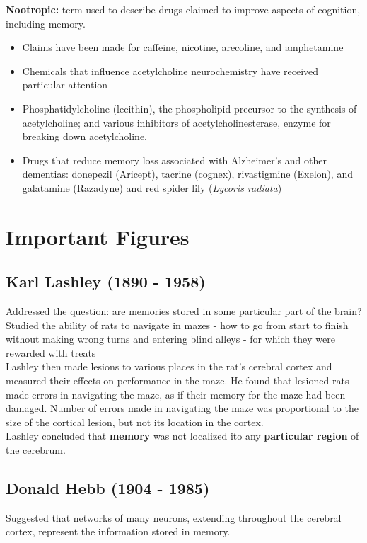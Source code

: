 \documentclass{article}
\begin{document}
\noindent \textbf{Nootropic:} term used to describe drugs claimed to improve aspects of cognition, including memory. 
\begin{itemize}
    \item Claims have been made for caffeine, nicotine, arecoline, and amphetamine
    \item Chemicals that influence acetylcholine neurochemistry have received particular attention
    \item Phosphatidylcholine (lecithin), the phospholipid precursor to the synthesis of acetylcholine; and various inhibitors of acetylcholinesterase, enzyme for breaking down acetylcholine. 
    \item Drugs that reduce memory loss associated with Alzheimer's and other dementias: donepezil (Aricept), tacrine (cognex), rivastigmine (Exelon), and galatamine (Razadyne) and red spider lily (\textit{Lycoris radiata})
\end{itemize}

\newpage
\section{Important Figures}

\subsection{Karl Lashley (1890 - 1958)}
Addressed the question: are memories stored in some particular part of the brain? \\ 
Studied the ability of rats to navigate in mazes - how to go from start to finish without making wrong turns and entering blind alleys - for which they were rewarded with treats \\ 

Lashley then made lesions to various places in the rat's cerebral cortex and measured their effects on performance in the maze. He found that lesioned rats made errors in navigating the maze, as if their memory for the maze had been damaged. Number of errors made in navigating the maze was proportional to the size of the cortical lesion, but not its location in the cortex. \\

Lashley concluded that \textbf{memory} was not localized ito any \textbf{particular region} of the cerebrum. 

\subsection{Donald Hebb (1904 - 1985)}
Suggested that networks of many neurons, extending throughout the cerebral cortex, represent the information stored in memory. \\
\end{document}
